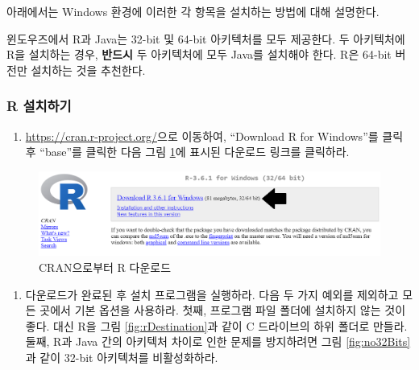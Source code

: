 \documentclass[11pt]{book}
\providecommand{\tightlist}{%
  \setlength{\itemsep}{0pt}\setlength{\parskip}{0pt}}
\theoremstyle{definition}
\theoremstyle{definition}
\theoremstyle{definition}
\theoremstyle{remark}
\let\BeginKnitrBlock\begin \let\EndKnitrBlock\end
\begin{document}
아래에서는 Windows 환경에 이러한 각 항목을 설치하는 방법에 대해
설명한다.

\BeginKnitrBlock{rmdimportant}
윈도우즈에서 R과 Java는 32-bit 및 64-bit 아키텍처를 모두 제공한다. 두
아키텍처에 R을 설치하는 경우, \textbf{반드시} 두 아키텍처에 모두 Java를
설치해야 한다. R은 64-bit 버전만 설치하는 것을 추천한다.
\EndKnitrBlock{rmdimportant}

\subsubsection*{R 설치하기}\label{r-}

\begin{enumerate}
\def\labelenumi{\arabic{enumi}.}
\tightlist
\item
  \url{https://cran.r-project.org/}으로 이동하여, ``Download R for
  Windows''를 클릭 후 ``base''를 클릭한 다음 그림 \ref{fig:downloadR}에
  표시된 다운로드 링크를 클릭하라.
\end{enumerate}

\begin{figure}

{\centering \includegraphics[width=1\linewidth]{images/OhdsiAnalyticsTools/downloadR} 

}

\caption{CRAN으로부터 R 다운로드}\label{fig:downloadR}
\end{figure}

\begin{enumerate}
\def\labelenumi{\arabic{enumi}.}
\setcounter{enumi}{1}
\tightlist
\item
  다운로드가 완료된 후 설치 프로그램을 실행하라. 다음 두 가지 예외를
  제외하고 모든 곳에서 기본 옵션을 사용하라. 첫째, 프로그램 파일 폴더에
  설치하지 않는 것이 좋다. 대신 R을 그림 \ref{fig:rDestination}과 같이 C
  드라이브의 하위 폴더로 만들라. 둘째, R과 Java 간의 아키텍처 차이로
  인한 문제를 방지하려면 그림 \ref{fig:no32Bits}과 같이 32-bit
  아키텍처를 비활성화하라.
\end{enumerate}
\end{document}
